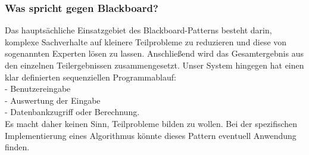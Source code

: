 \subsubsection{Was spricht gegen Blackboard?}
Das hauptsächliche Einsatzgebiet des Blackboard-Patterns besteht darin, komplexe Sachverhalte auf kleinere Teilprobleme zu reduzieren und diese von sogenannten Experten lösen zu lassen. Anschließend wird das Gesamtergebnis aus den einzelnen Teilergebnissen zusammengesetzt. 
Unser System hingegen hat einen klar definierten sequenziellen Programmablauf: \\
- Benutzereingabe\\
- Auswertung der Eingabe\\
- Datenbankzugriff oder Berechnung.\\
Es macht daher keinen Sinn, Teilprobleme bilden zu wollen. Bei der spezifischen Implementierung eines Algorithmus könnte dieses Pattern eventuell Anwendung finden.


